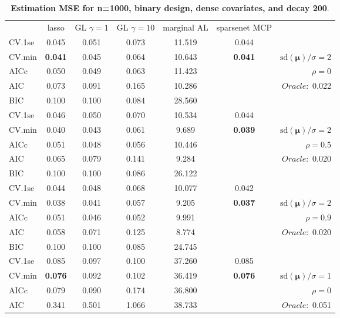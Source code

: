 \clearpage
\begin{table}\vspace{-.5cm}
\caption[l]{ { \bf Estimation MSE for n=1000, binary design, 
dense covariates, and  decay  200}.}
\vspace{-.5cm}
\footnotesize{}
\begin{center}
\begin{tabular}{l*{5}{c}|r}
& lasso & GL $\gamma=1$ & GL $\gamma=10$ & marginal AL & sparsenet MCP  & \\
 \cline{1-7}
CV.1se & 0.045 & 0.051 & 0.073 & 11.519 & 0.044 & \\
CV.min & {\bf 0.041} & 0.045 & 0.064 & 10.643 & {\bf 0.041} &  $\mathrm{sd}(\mathbf{\mu})/\sigma=2$ \\
AICc & 0.050 & 0.049 & 0.063 & 11.423 & & $\rho=0$ \\
AIC & 0.073 & 0.091 & 0.165 & 10.286 & &  \multirow{2}{*}{$Oracle: $ 0.022} \\
BIC & 0.100 & 0.100 & 0.084 & 28.560 & &  \\
 \hline 
CV.1se & 0.046 & 0.050 & 0.070 & 10.534 & 0.044 & \\
CV.min & 0.040 & 0.043 & 0.061 & 9.689 & {\bf 0.039} &  $\mathrm{sd}(\mathbf{\mu})/\sigma=2$ \\
AICc & 0.051 & 0.048 & 0.056 & 10.446 & & $\rho=0.5$ \\
AIC & 0.065 & 0.079 & 0.141 & 9.284 & &  \multirow{2}{*}{$Oracle: $ 0.020} \\
BIC & 0.100 & 0.100 & 0.086 & 26.122 & &  \\
 \hline 
CV.1se & 0.044 & 0.048 & 0.068 & 10.077 & 0.042 & \\
CV.min & 0.038 & 0.041 & 0.057 & 9.205 & {\bf 0.037} &  $\mathrm{sd}(\mathbf{\mu})/\sigma=2$ \\
AICc & 0.051 & 0.046 & 0.052 & 9.991 & & $\rho=0.9$ \\
AIC & 0.058 & 0.071 & 0.125 & 8.774 & &  \multirow{2}{*}{$Oracle: $ 0.020} \\
BIC & 0.100 & 0.100 & 0.085 & 24.745 & &  \\
 \hline 
CV.1se & 0.085 & 0.097 & 0.100 & 37.260 & 0.085 & \\
CV.min & {\bf 0.076} & 0.092 & 0.102 & 36.419 & {\bf 0.076} &  $\mathrm{sd}(\mathbf{\mu})/\sigma=1$ \\
AICc & 0.079 & 0.090 & 0.174 & 36.800 & & $\rho=0$ \\
AIC & 0.341 & 0.501 & 1.066 & 38.733 & &  \multirow{2}{*}{$Oracle: $ 0.051} \\

\end{tabular}
\end{center}
\end{table}
